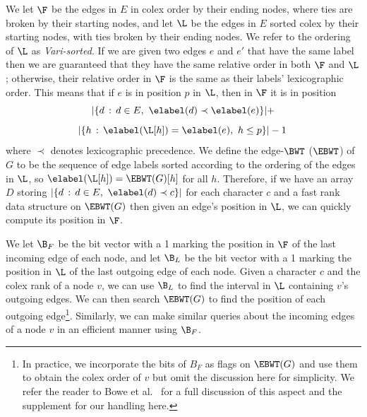 We let $\F$ be the edges in $E$ in colex order by their ending nodes, where ties are broken by their starting nodes, and let $\L$ be the edges in $E$ sorted colex by their starting nodes, with ties broken by their ending nodes.  We refer to the ordering of $\L$ as {\em Vari-sorted}. If we are given two edges $e$ and $e'$ that have the same label then we are guaranteed that they have the same relative order in both $\F$ and $\L$; otherwise, their relative order in $\F$ is the same as their labels' lexicographic order.  This means that if $e$ is in position $p$ in $\L$, then in $\F$ it is in position
\[|\{d\,:\,d \in E,\ \elabel (d) \prec \elabel (e)\}| + \]
	\[ |\{h\,:\,\elabel (\L [h]) = \elabel (e),\ h \leq p\}| - 1\,\]
where $\prec$ denotes lexicographic precedence.  We define the edge-$\BWT$ ($\EBWT$) of $G$ to be the sequence of edge labels sorted according to the ordering of the edges in $\L$, so \(\elabel (\L [h]) = \EBWT (G) [h]\) for all $h$. Therefore, if we have an array $D$ storing \(|\{d\,:\,d \in E,\ \elabel (d) \prec c\}|\) for each character $c$ and  a fast rank data structure on \(\EBWT (G)\) then given an edge's position in $\L$, we can quickly compute its position in $\F$.

We let $\B_F$ be the bit vector with a 1 marking the position in $\F$ of the last incoming edge of each node, and let $\B_L$ be the bit vector with a 1 marking the position in $\L$ of the last outgoing edge of each node.  Given a character $c$ and the colex rank of a node $v$, we can use $\B_L$ to find the interval in $\L$ containing $v$'s outgoing edges.  We can then search \(\EBWT (G)\) to find the position of each outgoing edge\footnote{In practice, we incorporate the bits of $B_F$ as flags on \(\EBWT (G)\) and use them to obtain the colex order of $v$ but omit the discussion here for simplicity.  We refer the reader to Bowe et al.~\cite{BOSS} for a full discussion of this aspect and the supplement for our handling here.}. Similarly, we can make similar queries about the incoming edges of a node $v$ in an efficient manner using $\B_F$.  


